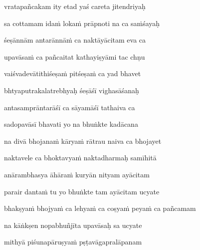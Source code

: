 vratapañcakam ity etad yaś careta jitendriyaḥ\thinspace{\dandab} \dontdisplaylinenum


sa cottamam ida\.m loka\.m prāpnoti na ca sa\.mśayaḥ \veg\dontdisplaylinenum

śeṣānnām antarānnā\.m ca naktāyācitam eva ca\thinspace{\dandab} \dontdisplaylinenum

upavāsa\.m ca pañcaitat kathayiṣyāmi tac chṇu \veg\dontdisplaylinenum

vaiśvadevātithiśeṣa\.m pitśeṣa\.m ca yad bhavet\thinspace{\dandab} \dontdisplaylinenum

bhtyaputrakalatrebhyaḥ śeṣāśī vighasāśanaḥ \veg\dontdisplaylinenum

antasamprāntarāśī ca sāyamāśī tathaiva ca\thinspace{\dandab} \dontdisplaylinenum

sadopavāsī bhavati yo na bhuṅkte kadācana \veg\dontdisplaylinenum

na divā bhojana\.m kārya\.m rātrau naiva ca bhojayet\thinspace{\dandab} \dontdisplaylinenum

naktavele ca bhoktavya\.m naktadharmaḥ samīhitā \veg\dontdisplaylinenum

anārambhasya āhāra\.m kuryān nityam ayācitam\thinspace{\dandab} \dontdisplaylinenum

parair danta\.m tu yo bhuṅkte tam ayācitam ucyate \veg\dontdisplaylinenum

bhakṣya\.m bhojya\.m ca lehya\.m ca coṣya\.m peya\.m ca pañcamam\thinspace{\dandab} \dontdisplaylinenum

na kāṅkṣen nopabhuñjīta upavāsaḥ sa ucyate \veg\dontdisplaylinenum


mithyā piśunapāruṣya\.m pṣṭavāgapralāpanam\thinspace{\dandab} \dontdisplaylinenum

